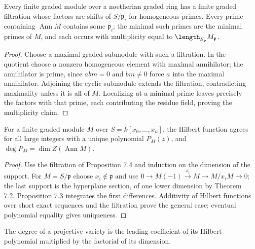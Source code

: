 \begin{proposition}
\label{prop:ha-ch1-7-4}
Every finite graded module over a noetherian graded ring has a finite graded filtration whose factors
are shifts of $S/\mathfrak p_i$ for homogeneous primes.  Every prime containing $\operatorname{Ann}M$
contains some $\mathfrak p_i$; the minimal such primes are the minimal primes of $M$, and each occurs
with multiplicity equal to $\length_{S_\mathfrak p}M_\mathfrak p$.
\end{proposition}
\begin{proof}
Choose a maximal graded submodule with such a filtration.  In the quotient choose a nonzero
homogeneous element with maximal annihilator; the annihilator is prime, since $abm=0$ and $bm\ne0$
force $a$ into the maximal annihilator.  Adjoining the cyclic submodule extends the filtration,
contradicting maximality unless it is all of $M$.  Localizing at a minimal prime leaves precisely
the factors with that prime, each contributing the residue field, proving the multiplicity claim.
\end{proof}

\begin{theorem}
\label{thm:ha-ch1-7-5}
For a finite graded module $M$ over $S=k[x_0,\ldots,x_n]$, the Hilbert function agrees for all
large integers with a unique polynomial $P_M(z)$, and \(\deg P_M=\dim Z(\operatorname{Ann}M)\).
\end{theorem}
\begin{proof}
Use the filtration of Proposition 7.4 and induction on the dimension of the support.  For
$M=S/\mathfrak p$ choose $x_i\notin\mathfrak p$ and use
$0\to M(-1)\xrightarrow{x_i}M\to M/x_iM\to0$; the last support is the hyperplane section,
of one lower dimension by Theorem 7.2.  Proposition 7.3 integrates the first differences.  Additivity
of Hilbert functions over short exact sequences and the filtration prove the general case; eventual
polynomial equality gives uniqueness.
\end{proof}

\begin{definition}[Degree]
\label{def:ha-ch1-degree}
The degree of a projective variety is the leading coefficient of its Hilbert polynomial multiplied
by the factorial of its dimension.
\end{definition}

